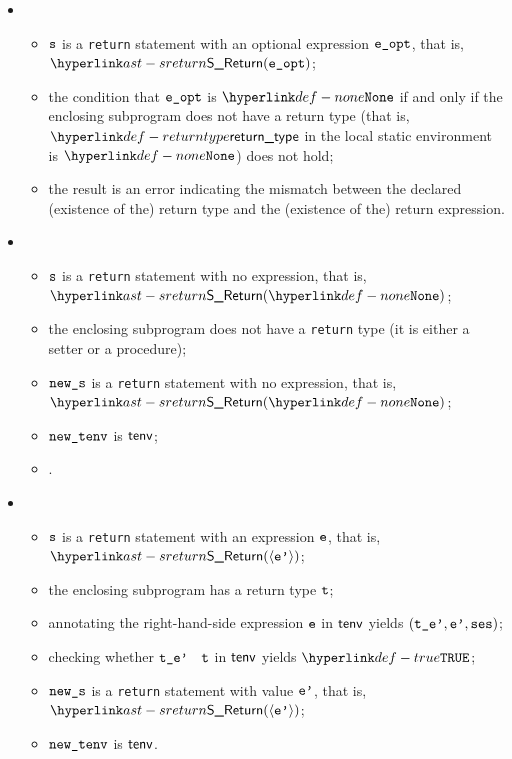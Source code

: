 \ProseParagraph
\OneApplies
\begin{itemize}
  \item {}
  \begin{itemize}
    \item $\vs$ is a \texttt{return} statement with an optional expression $\veopt$, that is, \\
          $\SReturn(\veopt)$;
    \item the condition that $\veopt$ is $\None$ if and only if the enclosing subprogram does not have a return type
          (that is, $\returntype$ in the local static environment is $\None$) does not hold;
    \item the result is an error indicating the mismatch between the declared (existence of the) return type
          and the (existence of the) return expression.
  \end{itemize}

  \item {}
  \begin{itemize}
    \item $\vs$ is a \texttt{return} statement with no expression, that is, $\SReturn(\None)$;
    \item the enclosing subprogram does not have a \texttt{return} type (it is either a setter
          or a procedure);
    \item $\news$ is a \texttt{return} statement with no expression, that is, $\SReturn(\None)$;
    \item $\newtenv$ is $\tenv$;
    \item {}.
  \end{itemize}

  \item {}
  \begin{itemize}
    \item $\vs$ is a \texttt{return} statement with an expression $\ve$, that is, $\SReturn(\langle \vep \rangle)$;
    \item the enclosing subprogram has a return type $\vt$;
    \item annotating the right-hand-side expression $\ve$ in $\tenv$ yields $(\tep,\vep,\vses)$\ProseOrTypeError;
    \item checking whether $\vtep$ \typesatisfies\ $\vt$ in $\tenv$ yields $\True$\ProseOrTypeError;
    \item $\news$ is a \texttt{return} statement with value $\vep$, that is, $\SReturn(\langle \vep \rangle)$;
    \item $\newtenv$ is $\tenv$.
  \end{itemize}
\end{itemize}
\FormallyParagraph
\begin{mathpar}
\end{mathpar}

